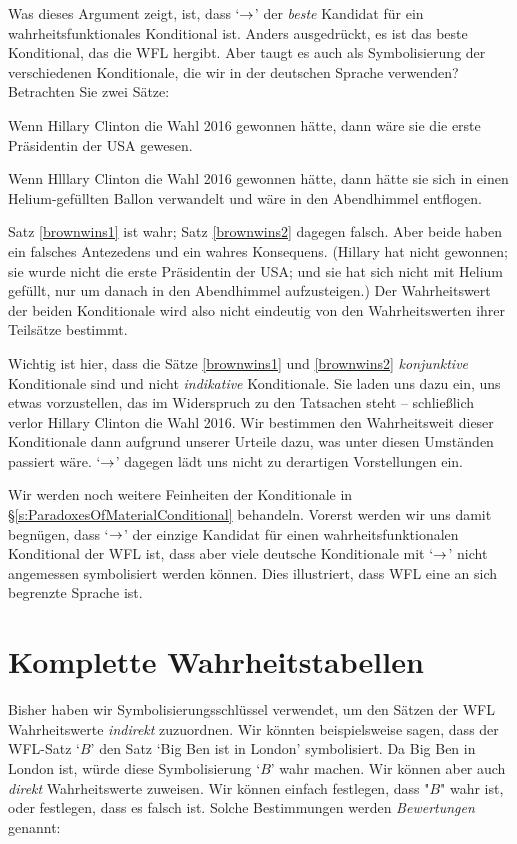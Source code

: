 Was dieses Argument zeigt, ist, dass `$\rightarrow$' der \emph{beste} Kandidat für ein wahrheitsfunktionales Konditional ist. Anders ausgedrückt, es ist das beste Konditional, das die WFL hergibt. Aber taugt es auch als Symbolisierung der verschiedenen Konditionale, die wir in der deutschen Sprache verwenden? Betrachten Sie zwei Sätze:
	\begin{earg}
		\item[\ex{brownwins1}] Wenn Hillary Clinton die Wahl 2016 gewonnen hätte, dann wäre sie die erste Präsidentin der USA gewesen.
		\item[\ex{brownwins2}] Wenn Hlllary Clinton die Wahl 2016 gewonnen hätte, dann hätte sie sich in einen Helium-gefüllten Ballon verwandelt und wäre in den Abendhimmel entflogen.
	\end{earg}
Satz \ref{brownwins1} ist wahr; Satz \ref{brownwins2} dagegen falsch. Aber beide haben ein falsches Antezedens und ein wahres Konsequens. (Hillary hat nicht gewonnen; sie wurde nicht die erste Präsidentin der USA; und sie hat sich nicht mit Helium gefüllt, nur um danach in den Abendhimmel aufzusteigen.) Der Wahrheitswert der beiden Konditionale wird also nicht eindeutig von den Wahrheitswerten ihrer Teilsätze bestimmt. 

Wichtig ist hier, dass die Sätze \ref{brownwins1} und \ref{brownwins2} \emph{konjunktive} Konditionale sind und nicht \emph{indikative} Konditionale. Sie laden uns dazu ein, uns etwas vorzustellen, das im Widerspruch zu den Tatsachen steht -- schlie{\ss}lich verlor Hillary Clinton die Wahl 2016. Wir bestimmen den Wahrheitsweit dieser Konditionale dann aufgrund unserer Urteile dazu, was unter diesen Umständen passiert wäre. `$\rightarrow$' dagegen lädt uns nicht zu derartigen Vorstellungen ein.

Wir werden noch weitere Feinheiten der Konditionale in \S\ref{s:ParadoxesOfMaterialConditional} behandeln. Vorerst werden wir uns damit begnügen, dass `$\rightarrow$' der einzige Kandidat für einen wahrheitsfunktionalen Konditional der WFL ist, dass aber viele deutsche Konditionale mit `$\rightarrow$' nicht angemessen symbolisiert werden können. Dies illustriert, dass WFL eine an sich begrenzte Sprache ist. 

\chapter{Komplette Wahrheitstabellen}
\label{s:CompleteTruthTables}

Bisher haben wir Symbolisierungsschlüssel verwendet, um den Sätzen der WFL Wahrheitswerte \emph{indirekt} zuzuordnen. Wir könnten beispielsweise sagen, dass der WFL-Satz `$B$' den Satz `Big Ben ist in London' symbolisiert. Da Big Ben in London ist, würde diese Symbolisierung `$B$' wahr machen. Wir können aber auch \emph{direkt} Wahrheitswerte zuweisen. Wir können einfach festlegen, dass "$B$" wahr ist, oder festlegen, dass es falsch ist. Solche Bestimmungen werden \emph{Bewertungen} genannt: 

